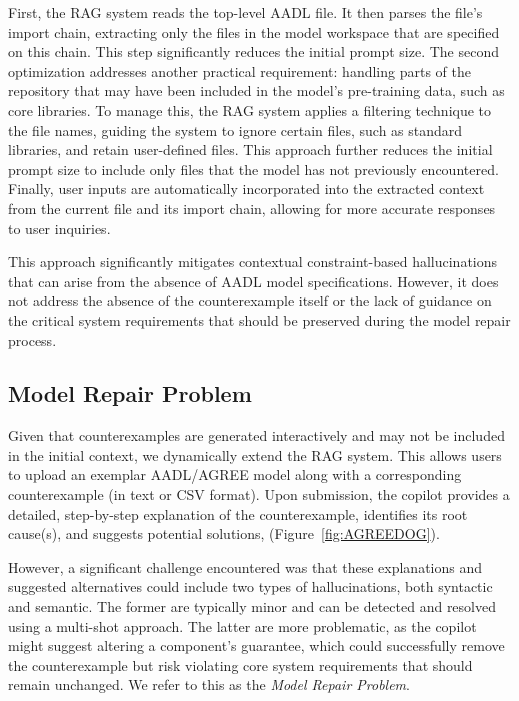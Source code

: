 First, the RAG system reads the top-level AADL file.  It then parses the file's import chain, extracting only the files in the model workspace that are specified on this chain. This step significantly reduces the initial prompt size.%
%
The second optimization addresses another practical requirement: handling parts of the repository that may have been included in the model's pre-training data, such as core libraries. To manage this, the RAG system applies a filtering technique to the file names, guiding the system to ignore certain files, such as standard libraries, and retain user-defined files. This approach further reduces the initial prompt size to include only files that the model has not previously encountered. Finally, user inputs are automatically incorporated into the extracted context from the current file and its import chain, allowing for more accurate responses to user inquiries.

This approach significantly mitigates contextual constraint-based hallucinations that can arise from the absence of AADL model specifications. However, it does not address the absence of the counterexample itself or the lack of guidance on the critical system requirements that should be preserved during the model repair process.
 

\subsection{Model Repair Problem}

Given that counterexamples are generated interactively and may not be included in the initial context, we dynamically extend the RAG system. This allows users to upload an exemplar AADL/AGREE model along with a corresponding counterexample (in text or CSV format). %
Upon submission, the copilot provides a detailed, step-by-step explanation of the counterexample, identifies its root cause(s), and suggests potential solutions, (Figure~\ref{fig:AGREEDOG}). 


However, a significant challenge encountered was that these explanations and suggested alternatives could include two types of hallucinations, both syntactic and semantic. The former are typically minor and can be detected and resolved using a multi-shot approach. The latter are more problematic, as the copilot might suggest altering a component's guarantee, which could successfully remove the counterexample but risk violating core system requirements that should remain unchanged.  We refer to this as the \textit{Model Repair Problem}. 


